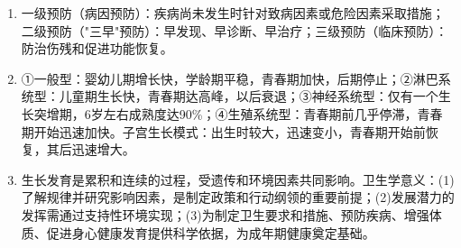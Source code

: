 {\begin{enumerate}[leftmargin=*, itemsep=5pt]
    \item 一级预防（病因预防）：疾病尚未发生时针对致病因素或危险因素采取措施；二级预防（"三早"预防）：早发现、早诊断、早治疗；三级预防（临床预防）：防治伤残和促进功能恢复。

    \item ①一般型：婴幼儿期增长快，学龄期平稳，青春期加快，后期停止；②淋巴系统型：儿童期生长快，青春期达高峰，以后衰退；③神经系统型：仅有一个生长突增期，6岁左右成熟度达90\%；④生殖系统型：青春期前几乎停滞，青春期开始迅速加快。子宫生长模式：出生时较大，迅速变小，青春期开始前恢复，其后迅速增大。

    \item 生长发育是累积和连续的过程，受遗传和环境因素共同影响。卫生学意义：(1)了解规律并研究影响因素，是制定政策和行动纲领的重要前提；(2)发展潜力的发挥需通过支持性环境实现；(3)为制定卫生要求和措施、预防疾病、增强体质、促进身心健康发育提供科学依据，为成年期健康奠定基础。
\end{enumerate}
}

\newpage
